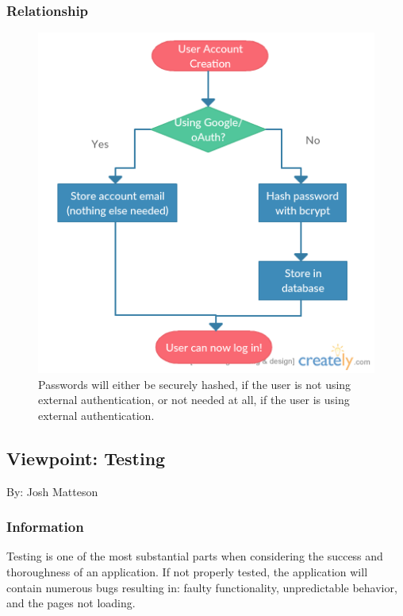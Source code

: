 \documentclass[letterpaper, 10pt, draftclsnofoot, compsoc, onecolumn]{IEEEtran}
\begin{document}
\subsubsection{Relationship}
\begin{figure}[ht!]
\centering
\includegraphics[scale=0.5]{password.png}
\caption{Passwords will either be securely hashed, if the user is not using external authentication, or not needed at all, if the user is using external authentication.}
\end{figure}
\pagebreak





\newpage
\subsection{Viewpoint: Testing}
{\noindent By: Josh Matteson \par}

\subsubsection{Information}
{\noindent Testing is one of the most substantial parts when considering the success and thoroughness of an application.
If not properly tested, the application will contain numerous bugs resulting in: faulty functionality, unpredictable behavior, and the pages not loading. \par}
\end{document}
